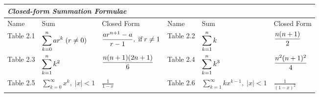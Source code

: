 \begin{questions}
\medskip
\begin{tabular}{llllll}
  \multicolumn{3}{l}{\textit{Closed-form Summation Formulae}} \\
  \hline 
  Name & Sum & Closed Form & Name & Sum & Closed Form \\
  Table 2.1 & $\displaystyle \sum_{k=0}^n ar^k \;(r \neq 0)$ 
    & $\displaystyle \frac{ar^{n+1} - a}{r-1}, \;\text{if}\; r \neq 1$ \hspace{0.25in}
    & Table 2.2 & $\displaystyle \sum_{k=1}^n k $
    & $\displaystyle \frac{n(n+1)}{2}$  \\
  Table 2.3 & $\displaystyle \sum_{k=1}^n k^2 $ 
    & $\displaystyle \frac{n(n+1)(2n+1)}{6}$  
    & Table 2.4 & $\displaystyle \sum_{k=1}^n k^3 $
    & $\displaystyle \frac{n^2(n+1)^2}{4} $  \\
  Table 2.5 & $\displaystyle \sum_{k=0}^{\infty} x^k, \;|x| < 1$ 
    & $\displaystyle \frac{1}{1-x}$ 
    & Table 2.6 & $\displaystyle \sum_{k=1}^{\infty} kx^{k-1}, \;|x| < 1$ & $\displaystyle \frac{1}{(1-x)^2} $\\
  \hline
\end{tabular}





\end{questions}
